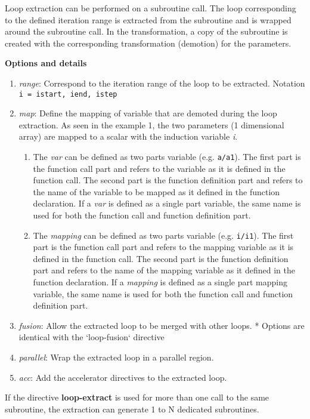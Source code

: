 \documentclass{article}
\begin{document}
Loop extraction can be performed on a subroutine call. The loop corresponding
to the defined iteration range is extracted from the subroutine and is wrapped
around the subroutine call. In the transformation, a copy of the subroutine
is created with the corresponding transformation (demotion) for the parameters.


\textbf{Options and details}
\begin{enumerate}
\item \textit{range}: Correspond to the iteration range of the loop to be extracted.
  Notation \lstinline!i = istart, iend, istep!
\item \textit{map}: Define the mapping of variable that are demoted during the loop
  extraction. As seen in the example 1, the two parameters (1 dimensional array)
  are mapped to a scalar with the induction variable \textit{i}.
  \begin{enumerate}
    \item The \textit{var} can be defined as two parts variable (e.g. \lstinline!a/a1!). The
    first part is the function call part and refers to the variable as it is
    defined in the function call. The second part is the function definition
    part and refers to the name of the variable to be mapped as it defined in
    the function declaration. If a \textit{var} is defined as a single part variable,
    the same name is used for both the function call and function definition
    part.
    \item The \textit{mapping} can be defined as two parts variable (e.g. \lstinline!i/i1!). The
    first part is the function call part and refers to the mapping variable as
    it is defined in the function call. The second part is the function
    definition part and refers to the name of the mapping variable as it defined
    in the function declaration. If a \textit{mapping} is defined as a single part
    mapping variable, the same name is used for both the function call and
    function definition part.
    \end{enumerate}
\item \textit{fusion}: Allow the extracted loop to be merged with other loops.
  * Options are identical with the `loop-fusion` directive
\item \textit{parallel}: Wrap the extracted loop in a parallel region.
\item \textit{acc}: Add the accelerator directives to the extracted loop.
\end{enumerate}

If the directive \textbf{loop-extract} is used for more than one call to the same
subroutine, the extraction can generate 1 to N dedicated subroutines.
\end{document}
